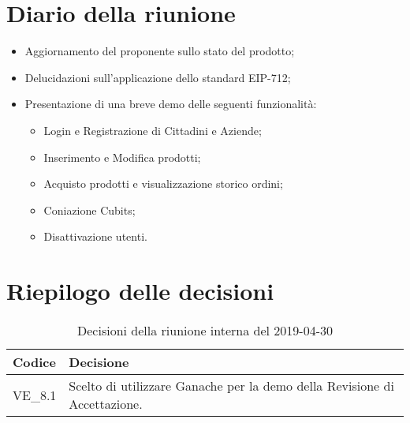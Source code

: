 \section{Diario della riunione}
\begin{itemize}
	\item Aggiornamento del proponente sullo stato del prodotto;
	\item Delucidazioni sull'applicazione dello standard EIP-712\glo;
	\item Presentazione di una breve demo delle seguenti funzionalità:
	\begin{itemize}
		\item Login e Registrazione di Cittadini e Aziende;
		\item Inserimento e Modifica prodotti;
		\item Acquisto prodotti e visualizzazione storico ordini;
		\item Coniazione Cubits;
		\item Disattivazione utenti.
	\end{itemize}
\end{itemize}

\hspace{3cm}

\section{Riepilogo delle decisioni}

	
	\begin{longtable}{ >{\centering}p{} >{}p{}}
		\caption{Decisioni della riunione interna del 2019-04-30}\\	
		\rowcolorhead
		\textbf{\color{white}Codice} 
		& \centering\textbf{\color{white}Decisione} 
		\tabularnewline 
		\endfirsthead
		VE\_8.1 & Scelto di utilizzare Ganache per la demo della Revisione di 
		Accettazione.
		
		
	\end{longtable}
	




